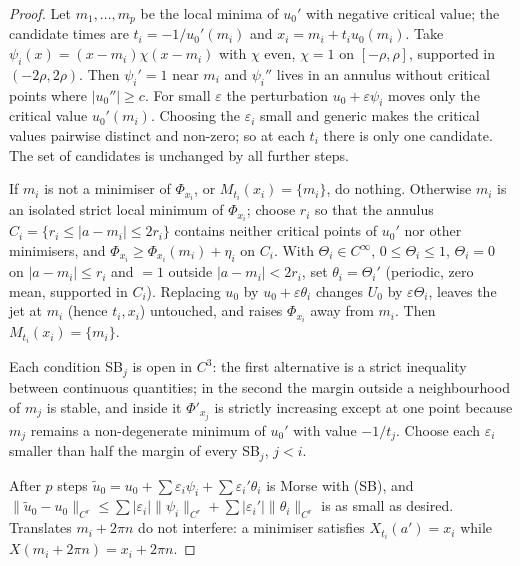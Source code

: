 \begin{proof}
Let $m_1,\dots,m_p$ be the local minima of $u_0'$ with negative critical value; the candidate times are $t_i=-1/u_0'(m_i)$ and $x_i=m_i+t_iu_0(m_i)$. Take $\psi_i(x)=(x-m_i)\chi(x-m_i)$ with $\chi$ even, $\chi=1$ on $[-\rho,\rho]$, supported in $(-2\rho,2\rho)$. Then $\psi_i'=1$ near $m_i$ and $\psi_i''$ lives in an annulus without critical points where $|u_0''|\ge c$. For small $\varepsilon$ the perturbation $u_0+\varepsilon\psi_i$ moves only the critical value $u_0'(m_i)$. Choosing the $\varepsilon_i$ small and generic makes the critical values pairwise distinct and non-zero; so at each $t_i$ there is only one candidate. The set of candidates is unchanged by all further steps.

If $m_i$ is not a minimiser of $\Phi_{x_i}$, or $M_{t_i}(x_i)=\{m_i\}$, do nothing. Otherwise $m_i$ is an isolated strict local minimum of $\Phi_{x_i}$; choose $r_i$ so that the annulus $C_i=\{r_i\le|a-m_i|\le2r_i\}$ contains neither critical points of $u_0'$ nor other minimisers, and $\Phi_{x_i}\ge\Phi_{x_i}(m_i)+\eta_i$ on $C_i$. With $\Theta_i\in C^\infty$, $0\le\Theta_i\le1$, $\Theta_i=0$ on $|a-m_i|\le r_i$ and $=1$ outside $|a-m_i|<2r_i$, set $\theta_i=\Theta_i'$ (periodic, zero mean, supported in $C_i$). Replacing $u_0$ by $u_0+\varepsilon\theta_i$ changes $U_0$ by $\varepsilon\Theta_i$, leaves the jet at $m_i$ (hence $t_i,x_i$) untouched, and raises $\Phi_{x_i}$ away from $m_i$. Then $M_{t_i}(x_i)=\{m_i\}$.

Each condition SB$_j$ is open in $C^3$: the first alternative is a strict inequality between continuous quantities; in the second the margin outside a neighbourhood of $m_j$ is stable, and inside it $\Phi'_{x_j}$ is strictly increasing except at one point because $m_j$ remains a non-degenerate minimum of $u_0'$ with value $-1/t_j$. Choose each $\varepsilon_i$ smaller than half the margin of every SB$_j$, $j<i$.

After $p$ steps $\tilde u_0=u_0+\sum\varepsilon_i\psi_i+\sum\varepsilon_i'\theta_i$ is Morse with (SB), and $\|\tilde u_0-u_0\|_{C^r}\le\sum|\varepsilon_i|\|\psi_i\|_{C^r}+\sum|\varepsilon_i'|\|\theta_i\|_{C^r}$ is as small as desired. Translates $m_i+2\pi n$ do not interfere: a minimiser satisfies $X_{t_i}(a')=x_i$ while $X(m_i+2\pi n)=x_i+2\pi n$.

\end{proof}

